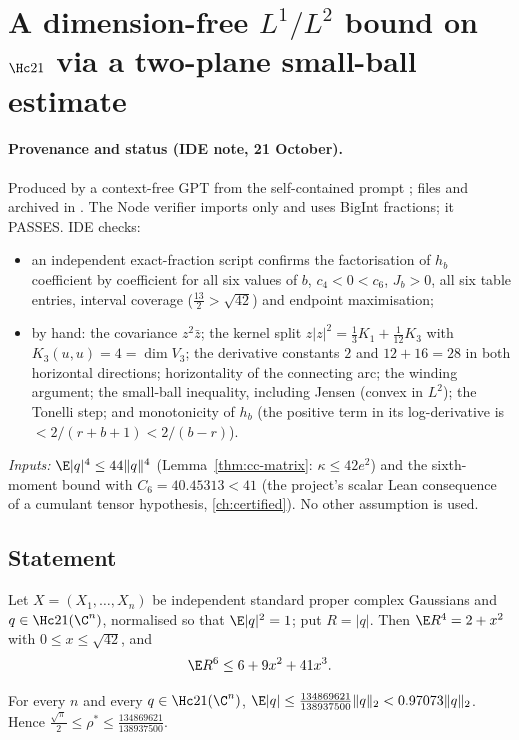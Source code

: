 \section{A dimension-free $L^1/L^2$ bound on $\Hc21$ via a two-plane small-ball estimate}\label{ch:l1l2-chaos21}

\paragraph{Provenance and status (IDE note, 21 October).} Produced by a context-free GPT from the self-contained prompt
; files  and  archived in . The Node
verifier imports only  and uses BigInt fractions; it PASSES. IDE checks:
\begin{itemize}
\item an independent exact-fraction script confirms the factorisation of $h_b$ coefficient by coefficient for all six values of $b$,
$c_4<0<c_6$, $J_b>0$, all six table entries, interval coverage ($\frac{13}2>\sqrt{42}$) and endpoint maximisation;
\item by hand: the covariance $z^2\bar z$; the kernel split $z|z|^2=\frac13K_1+\frac1{12}K_3$ with $K_3(u,u)=4=\dim V_3$; the derivative constants
$2$ and $12+16=28$ in both horizontal directions; horizontality of the connecting arc; the winding argument; the small-ball inequality, including
Jensen (convex in $L^2$); the Tonelli step; and monotonicity of $h_b$ (the positive term in its log-derivative is $<2/(r+b+1)<2/(b-r)$).
\end{itemize}
\emph{Inputs:} $\E|q|^4\le44\|q\|^4$ (Lemma~\ref{thm:cc-matrix}: $\kappa\le42e^2$) and the sixth-moment bound with $C_6=40.45313<41$
(the project's scalar Lean consequence of a cumulant tensor hypothesis, \autoref{ch:certified}). No other assumption is used.

\subsection{Statement}
Let $X=(X_1,\dots,X_n)$ be independent standard proper complex Gaussians and $q\in\Hc21(\C^n)$, normalised so that $\E|q|^2=1$; put $R=|q|$.
Then $\E R^4=2+x^2$ with $0\le x\le\sqrt{42}$, and
\begin{equation}\label{eq:l1l2-m6}
\E R^6\le6+9x^2+41x^3.
\end{equation}
\begin{theorem}[\st{P}+\st{C}]\label{thm:l1l2}
For every $n$ and every $q\in\Hc21(\C^n)$, $\E|q|\le\frac{134869621}{138937500}\|q\|_2<0.97073\|q\|_2$. Hence
$\frac{\sqrt\pi}2\le\rho^*\le\frac{134869621}{138937500}$.
\end{theorem}

